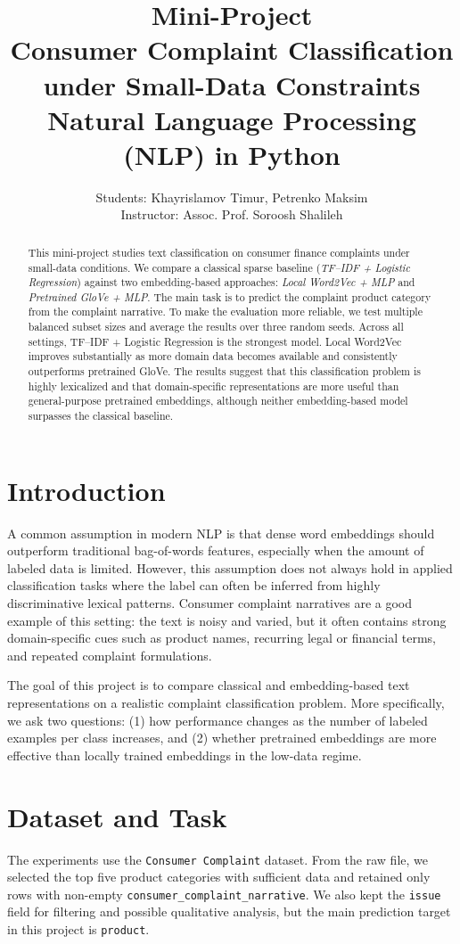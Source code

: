 \documentclass[10pt]{article}
\title{\textbf{Mini-Project\\Consumer Complaint Classification under Small-Data Constraints}\\
Natural Language Processing (NLP) in Python}
\author{Students: Khayrislamov Timur, Petrenko Maksim \\ Instructor: Assoc. Prof. Soroosh Shalileh}
\date{}
\begin{document}
\maketitle

\begin{abstract}
This mini-project studies text classification on consumer finance complaints under small-data conditions. We compare a classical sparse baseline (\textit{TF--IDF + Logistic Regression}) against two embedding-based approaches: \textit{Local Word2Vec + MLP} and \textit{Pretrained GloVe + MLP}. The main task is to predict the complaint product category from the complaint narrative. To make the evaluation more reliable, we test multiple balanced subset sizes and average the results over three random seeds. Across all settings, TF--IDF + Logistic Regression is the strongest model. Local Word2Vec improves substantially as more domain data becomes available and consistently outperforms pretrained GloVe. The results suggest that this classification problem is highly lexicalized and that domain-specific representations are more useful than general-purpose pretrained embeddings, although neither embedding-based model surpasses the classical baseline.
\end{abstract}

\section{Introduction}
A common assumption in modern NLP is that dense word embeddings should outperform traditional bag-of-words features, especially when the amount of labeled data is limited. However, this assumption does not always hold in applied classification tasks where the label can often be inferred from highly discriminative lexical patterns. Consumer complaint narratives are a good example of this setting: the text is noisy and varied, but it often contains strong domain-specific cues such as product names, recurring legal or financial terms, and repeated complaint formulations.

The goal of this project is to compare classical and embedding-based text representations on a realistic complaint classification problem. More specifically, we ask two questions: (1) how performance changes as the number of labeled examples per class increases, and (2) whether pretrained embeddings are more effective than locally trained embeddings in the low-data regime.

\section{Dataset and Task}
The experiments use the \texttt{Consumer Complaint} dataset. From the raw file, we selected the top five product categories with sufficient data and retained only rows with non-empty \texttt{consumer\_complaint\_narrative}. We also kept the \texttt{issue} field for filtering and possible qualitative analysis, but the main prediction target in this project is \texttt{product}.
\end{document}
